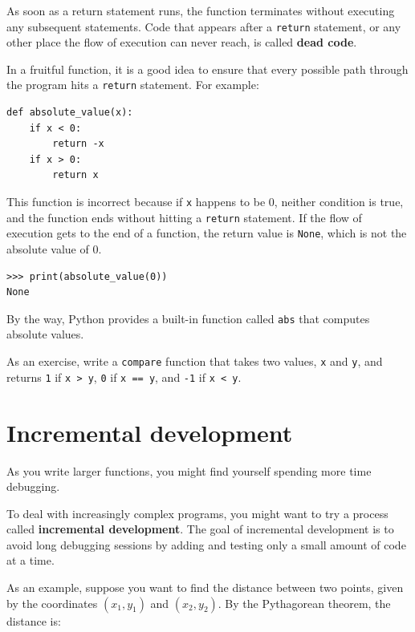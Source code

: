 \documentclass[10pt]{book}
\begin{document}
As soon as a return statement runs, the function
terminates without executing any subsequent statements.
Code that appears after a {\tt return} statement, or any other place
the flow of execution can never reach, is called {\bf dead code}.

In a fruitful function, it is a good idea to ensure
that every possible path through the program hits a
{\tt return} statement.  For example:

\begin{verbatim}
def absolute_value(x):
    if x < 0:
        return -x
    if x > 0:
        return x
\end{verbatim}
%
This function is incorrect because if {\tt x} happens to be 0,
neither condition is true, and the function ends without hitting a
{\tt return} statement.  If the flow of execution gets to the end
of a function, the return value is {\tt None}, which is not
the absolute value of 0.

\begin{verbatim}
>>> print(absolute_value(0))
None
\end{verbatim}
%
By the way, Python provides a built-in function called
{\tt abs} that computes absolute values.

As an exercise, write a {\tt compare} function that
takes two values, {\tt x} and {\tt y}, and returns {\tt 1} if {\tt x > y},
{\tt 0} if {\tt x == y}, and {\tt -1} if {\tt x < y}.


\section{Incremental development}
\label{incremental.development}

As you write larger functions, you might find yourself
spending more time debugging.

To deal with increasingly complex programs,
you might want to try a process called
{\bf incremental development}.  The goal of incremental development
is to avoid long debugging sessions by adding and testing only
a small amount of code at a time.

As an example, suppose you want to find the distance between two
points, given by the coordinates $(x_1, y_1)$ and $(x_2, y_2)$.
By the Pythagorean theorem, the distance is:
\end{document}
